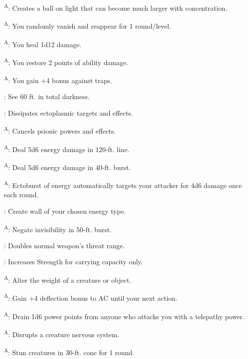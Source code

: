 \textsuperscript{A}: Creates a ball on light that can become much larger with concentration.

\textsuperscript{A}: You randomly vanish and reappear for 1 round/level.

\textsuperscript{A}: You heal 1d12 damage.

\textsuperscript{A}: You restore 2 points of ability damage.

\textsuperscript{A}: You gain +4 bonus against traps.

: See 60 ft. in total darkness.

: Dissipates ectoplasmic targets and effects.

\textsuperscript{A}: Cancels psionic powers and effects.

\textsuperscript{A}: Deal 5d6 energy damage in 120-ft. line.

\textsuperscript{A}: Deal 5d6 energy damage in 40-ft. burst.

\textsuperscript{A}: Ectoburst of energy automatically targets your attacker for 4d6 damage once each round.

: Create wall of your chosen energy type.

\textsuperscript{A}: Negate invisibility in 50-ft. burst.

: Doubles normal weapon's threat range.

: Increases Strength for carrying capacity only.

\textsuperscript{A}: Alter the weight of a creature or object.

\textsuperscript{A}: Gain +4 deflection bonus to AC until your next action.

\textsuperscript{A}: Drain 1d6 power points from anyone who attacks you with a telepathy power.

\textsuperscript{A}: Disrupts a creature nervous system.

\textsuperscript{A}: Stun creatures in 30-ft. cone for 1 round.

